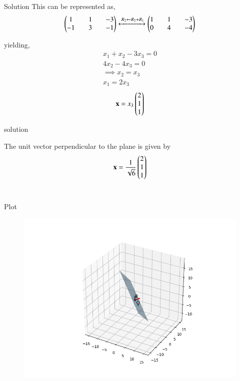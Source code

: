 \documentclass{beamer}
\begin{document}
\begin{frame}{Solution}
This can be represented as,
\begin{align}
    \begin{pmatrix}1&&1&&-3\\-1&&3&&-1\end{pmatrix}
    \xleftrightarrow{\,R_2 \gets R_2+R_1}
    \begin{pmatrix}1&&1&&-3\\0&&4&&-4\end{pmatrix}
\end{align}

yielding,
\begin{align}
    x_1+x_2-3x_3=0\\
    4x_2-4x_3=0 \\
    \implies x_2=x_3 \\
    x_1 = 2x_3
\end{align}
\begin{align}
    \mathbf{x}=x_3\begin{pmatrix}2\\1\\1\end{pmatrix}
\end{align}
\end{frame}

\begin{frame}{solution}

The unit vector perpendicular to the plane is given by \\
\begin{align}
     \mathbf{x}=\frac{1}{\sqrt{6}}\begin{pmatrix}2\\1\\1\end{pmatrix}
\end{align}
\\
\end{frame}

\begin{frame}{Plot}
    \begin{figure}[H]
    \centering
    \includegraphics[width=0.8\columnwidth]{../figs/fig.png}
    \label{fig:1}
\end{figure}
\end{frame}
\end{document}
